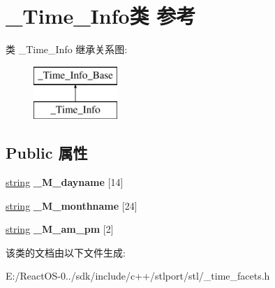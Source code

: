\hypertarget{class___time___info}{}\section{\+\_\+\+Time\+\_\+\+Info类 参考}
\label{class___time___info}
类 \+\_\+\+Time\+\_\+\+Info 继承关系图\+:\begin{figure}[H]
\begin{center}
\leavevmode
\includegraphics[height=2.000000cm]{class___time___info}
\end{center}
\end{figure}
\subsection*{Public 属性}
\begin{DoxyCompactItemize}
\item 
\mbox{\label{class___time___info_a30bfb69e247046f3dd41e82a42ca8e1d}} 
\hyperlink{structstring}{string} {\bfseries \+\_\+\+M\+\_\+dayname} \mbox{[}14\mbox{]}
\item 
\mbox{\label{class___time___info_a44df1bf6504a581705538891ee67369f}} 
\hyperlink{structstring}{string} {\bfseries \+\_\+\+M\+\_\+monthname} \mbox{[}24\mbox{]}
\item 
\mbox{\label{class___time___info_a25e3852e56021550ca0db9b58ce42428}} 
\hyperlink{structstring}{string} {\bfseries \+\_\+\+M\+\_\+am\+\_\+pm} \mbox{[}2\mbox{]}
\end{DoxyCompactItemize}


该类的文档由以下文件生成\+:\begin{DoxyCompactItemize}
\item 
E\+:/\+React\+O\+S-\/0../sdk/include/c++/stlport/stl/\+\_\+time\+\_\+facets.\+h\end{DoxyCompactItemize}
